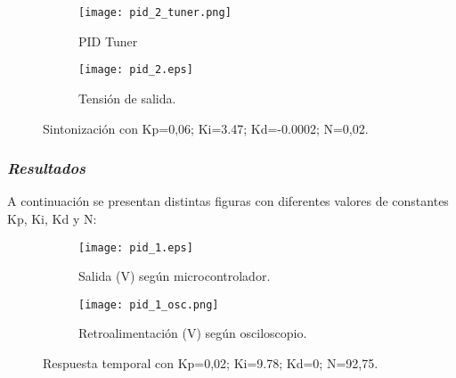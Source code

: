 \begin{figure}[H]
    \centering

    \begin{subfigure}[b]{0.49\textwidth}
        \centering
        \texttt{[image: pid\_2\_tuner.png]}
        \caption{PID Tuner}
        \label{fig:pid2_tuner}
    \end{subfigure}
    \begin{subfigure}[b]{0.49\textwidth}
        \centering
        \texttt{[image: pid\_2.eps]}
        \caption{Tensión de salida.}
        \label{fig:pid2_micro}
    \end{subfigure}

    \vspace{-0.25cm}
    \caption{Sintonización con Kp=0,06; Ki=3.47; Kd=-0.0002; N=0,02.}
    \label{fig:sintonizacion}
\end{figure}
\vspace{-0.5cm}

\subsubsection*{\it{Resultados}}
\vspace{-0.25cm}

A continuación se presentan distintas figuras con diferentes valores de constantes Kp, Ki, Kd y N:

\begin{figure}[H]
    \centering

    \begin{subfigure}[b]{0.49\textwidth}
        \centering
        \texttt{[image: pid\_1.eps]}
        \caption{Salida (V) según microcontrolador.}
        \label{fig:pid1_micro}
    \end{subfigure}
    \begin{subfigure}[b]{0.49\textwidth}
        \centering
        \texttt{[image: pid\_1\_osc.png]}
        \caption{Retroalimentación (V) según osciloscopio.}
        \label{fig:pid_1_osciloscopio}
    \end{subfigure}

    \vspace{-0.25cm}
    \caption{Respuesta temporal con Kp=0,02; Ki=9.78; Kd=0; N=92,75.}
    \label{fig:pid1_osciloscopio}
\end{figure}
\vspace{-0.5cm}

